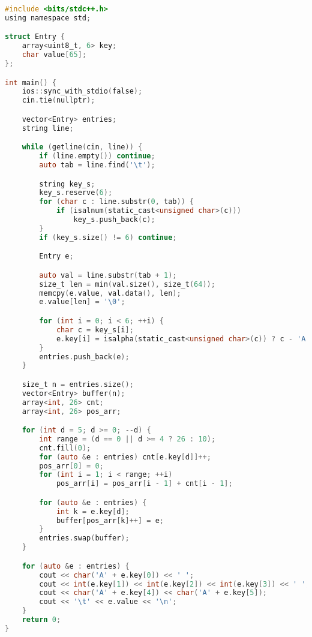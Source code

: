 \begin{lstlisting}[language=C]
	#include <bits/stdc++.h>
using namespace std;

struct Entry {
    array<uint8_t, 6> key;
    char value[65];
};

int main() {
    ios::sync_with_stdio(false);
    cin.tie(nullptr);

    vector<Entry> entries;
    string line;

    while (getline(cin, line)) {
        if (line.empty()) continue;
        auto tab = line.find('\t');

        string key_s;
        key_s.reserve(6);
        for (char c : line.substr(0, tab)) {
            if (isalnum(static_cast<unsigned char>(c)))
                key_s.push_back(c);
        }
        if (key_s.size() != 6) continue;

        Entry e;

        auto val = line.substr(tab + 1);
        size_t len = min(val.size(), size_t(64));
        memcpy(e.value, val.data(), len);
        e.value[len] = '\0';

        for (int i = 0; i < 6; ++i) {
            char c = key_s[i];
            e.key[i] = isalpha(static_cast<unsigned char>(c)) ? c - 'A' : c - '0';
        }
        entries.push_back(e);
    }

    size_t n = entries.size();
    vector<Entry> buffer(n);
    array<int, 26> cnt;
    array<int, 26> pos_arr;

    for (int d = 5; d >= 0; --d) {
        int range = (d == 0 || d >= 4 ? 26 : 10);
        cnt.fill(0);
        for (auto &e : entries) cnt[e.key[d]]++;
        pos_arr[0] = 0;
        for (int i = 1; i < range; ++i)
            pos_arr[i] = pos_arr[i - 1] + cnt[i - 1];

        for (auto &e : entries) {
            int k = e.key[d];
            buffer[pos_arr[k]++] = e;
        }
        entries.swap(buffer);
    }

    for (auto &e : entries) {
        cout << char('A' + e.key[0]) << ' ';
        cout << int(e.key[1]) << int(e.key[2]) << int(e.key[3]) << ' ';
        cout << char('A' + e.key[4]) << char('A' + e.key[5]);
        cout << '\t' << e.value << '\n';
    }
    return 0;
}

\end{lstlisting}

\pagebreak

